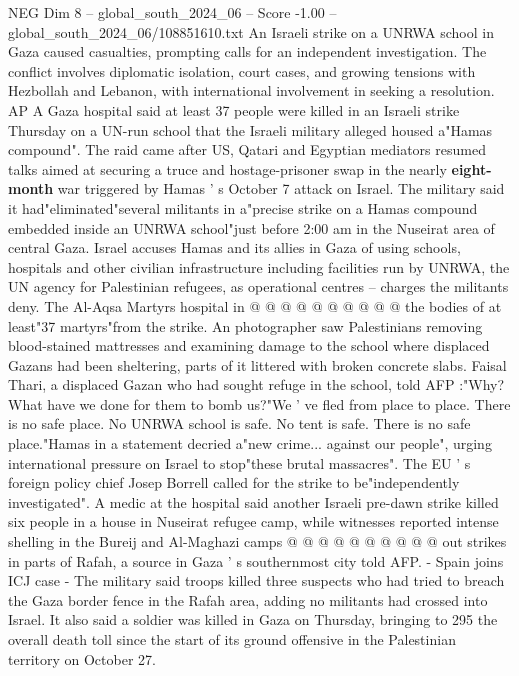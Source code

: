 \begin{textsample}{NEG Dim 8 – global\_south\_2024\_06 – Score -1.00 – global\_south\_2024\_06/108851610.txt}  \label{ex:f8_neg_043}
An Israeli strike on a UNRWA school in Gaza caused casualties, prompting calls for an independent investigation.
The conflict involves diplomatic isolation, court cases, and growing tensions with Hezbollah and Lebanon, with international involvement in seeking a resolution.
AP A Gaza hospital said at least 37 people were killed in an Israeli strike Thursday on a UN-run school that the Israeli military alleged housed a"Hamas compound".
The raid came after US, Qatari and Egyptian mediators resumed talks aimed at securing a truce and hostage-prisoner swap in the nearly \textbf{eight-month} war triggered by Hamas ' s October 7 attack on Israel.
The military said it had"eliminated"several militants in a"precise strike on a Hamas compound embedded inside an UNRWA school"just before 2:00 am in the Nuseirat area of central Gaza.
Israel accuses Hamas and its allies in Gaza of using schools, hospitals and other civilian infrastructure including facilities run by UNRWA, the UN agency for Palestinian refugees, as operational centres -- charges the militants deny.
The Al-Aqsa Martyrs hospital in @ @ @ @ @ @ @ @ @ @ the bodies of at least"37 martyrs"from the strike.
An photographer saw Palestinians removing blood-stained mattresses and examining damage to the school where displaced Gazans had been sheltering, parts of it littered with broken concrete slabs.
Faisal Thari, a displaced Gazan who had sought refuge in the school, told AFP :"Why?
What have we done for them to bomb us?"We ' ve fled from place to place.
There is no safe place.
No UNRWA school is safe.
No tent is safe.
There is no safe place."Hamas in a statement decried a"new crime... against our people", urging international pressure on Israel to stop"these brutal massacres".
The EU ' s foreign policy chief Josep Borrell called for the strike to be"independently investigated".
A medic at the hospital said another Israeli pre-dawn strike killed six people in a house in Nuseirat refugee camp, while witnesses reported intense shelling in the Bureij and Al-Maghazi camps @ @ @ @ @ @ @ @ @ @ out strikes in parts of Rafah, a source in Gaza ' s southernmost city told AFP. - Spain joins ICJ case - The military said troops killed three suspects who had tried to breach the Gaza border fence in the Rafah area, adding no militants had crossed into Israel.
It also said a soldier was killed in Gaza on Thursday, bringing to 295 the overall death toll since the start of its ground offensive in the Palestinian territory on October 27.

\end{textsample}

